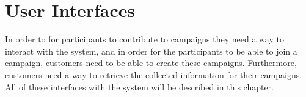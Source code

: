 
\chapter{User Interfaces}
\label{cha:user_interfaces}

In order to for participants to contribute to campaigns they need a way to interact with the system, and in order for the participants to be able to join a campaign, customers need to be able to create these campaigns. Furthermore, customers need a way to retrieve the collected information for their campaigns. All of these interfaces with the system will be described in this chapter.



